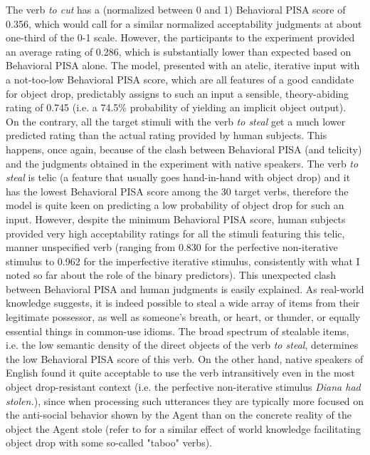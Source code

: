 The verb \textit{to cut} has a (normalized between 0 and 1) Behavioral PISA score of 0.356, which would call for a similar normalized acceptability judgments at about one-third of the 0-1 scale. However, the participants to the experiment provided an average rating of 0.286, which is substantially lower than expected based on Behavioral PISA alone. The model, presented with an atelic, iterative input with a not-too-low Behavioral PISA score, which are all features of a good candidate for object drop, predictably assigns to such an input a sensible, theory-abiding rating of 0.745 (i.e. a 74.5\% probability of yielding an implicit object output).\\ 
On the contrary, all the target stimuli with the verb \textit{to steal} get a much lower predicted rating than the actual rating provided by human subjects. This happens, once again, because of the clash between Behavioral PISA (and telicity) and the judgments obtained in the experiment with native speakers. The verb \textit{to steal} is telic (a feature that usually goes hand-in-hand with object drop) and it has the lowest Behavioral PISA score among the 30 target verbs, therefore the model is quite keen on predicting a low probability of object drop for such an input. However, despite the minimum Behavioral PISA score, human subjects provided very high acceptability ratings for all the stimuli featuring this telic, manner unspecified verb (ranging from 0.830 for the perfective non-iterative stimulus to 0.962 for the imperfective iterative stimulus, consistently with what I noted so far about the role of the binary predictors). This unexpected clash between Behavioral PISA and human judgments is easily explained. As real-world knowledge suggests, it is indeed possible to steal a wide array of items from their legitimate possessor, as well as someone's breath, or heart, or thunder, or equally essential things in common-use idioms. The broad spectrum of stealable items, i.e. the low semantic density of the direct objects of the verb \textit{to steal}, determines the low Behavioral PISA score of this verb. On the other hand, native speakers of English found it quite acceptable to use the verb intransitively even in the most object drop-resistant context (i.e. the perfective non-iterative stimulus \textit{Diana had stolen.}), since when processing such utterances they are typically more focused on the anti-social behavior shown by the Agent than on the concrete reality of the object the Agent stole (refer to \textcite[21-28]{Goldberg2005} for a similar effect of world knowledge facilitating object drop with some so-called "taboo" verbs). 


